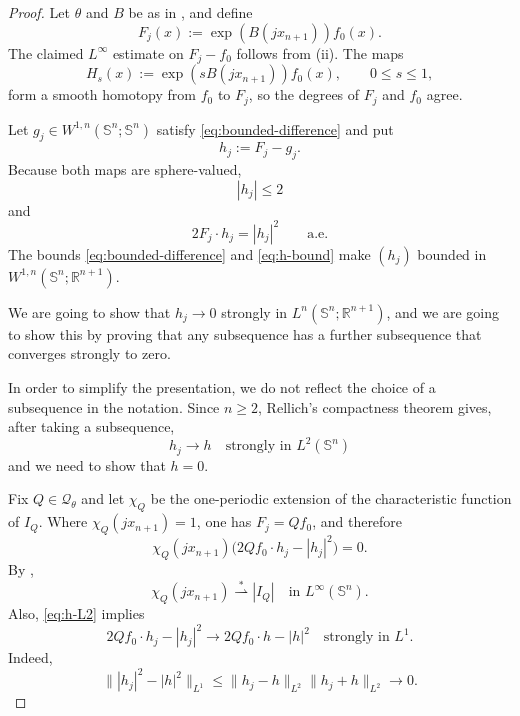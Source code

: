 \documentclass[10pt,a4paper]{amsart}
\newcommand{\R}{\mathbb R}
\newcommand{\Sph}{\mathbb S}
\newcommand{\weakstar}{\mathrel{\stackrel{*}{\rightharpoonup}}}
\begin{document}
\begin{proof}
Let $\theta$ and $B$ be as in , and define
\begin{equation}\label{eq:Fj-def}
  F_j(x):=\exp(B(jx_{n+1}))f_0(x).
\end{equation}
The claimed $L^\infty$ estimate on $F_j-f_0$ follows from (ii).  The maps
\[
  H_s(x):=\exp(sB(jx_{n+1}))f_0(x),
  \qquad0\le s\le1,
\]
form a smooth homotopy from $f_0$ to $F_j$, so the degrees of $F_j$ and $f_0$ agree.

Let $g_j\in W^{1,n}(\Sph^n;\Sph^n)$ satisfy \eqref{eq:bounded-difference} and put
\[
  h_j:=F_j-g_j.
\]
Because both maps are sphere-valued,
\begin{equation}\label{eq:h-bound}
  |h_j|\le2
\end{equation}
and
\begin{equation}\label{eq:sphere-identity}
  2F_j\cdot h_j=|h_j|^2
  \qquad\text{a.e.}
\end{equation}
The bounds \eqref{eq:bounded-difference} and \eqref{eq:h-bound} make $(h_j)$ bounded in $W^{1,n}(\Sph^n;\R^{n+1})$. 

We are going to show that $h_j\to 0$ strongly in $L^n(\Sph^n;\R^{n+1})$, and we are going to show this by proving that any subsequence has a further subsequence that converges strongly to zero. 

In order to simplify the presentation, we do not reflect the choice of a subsequence in the notation. Since $n\ge2$, Rellich's compactness theorem gives, after taking a subsequence,
\begin{equation}\label{eq:h-L2}
  h_j\to h\quad\text{strongly in }L^2(\Sph^n)
\end{equation}
and we need to show that $h=0$.

Fix $Q\in\mathcal Q_\theta$ and let $\chi_Q$ be the one-periodic extension of the characteristic function of $I_Q$.  Where $\chi_Q(jx_{n+1})=1$, one has $F_j=Qf_0$, and therefore
\begin{equation}\label{eq:plateau-identity}
  \chi_Q(jx_{n+1})
  \bigl(2Qf_0\cdot h_j-|h_j|^2\bigr)=0.
\end{equation}
By ,
\begin{equation}\label{eq:chi-average}
  \chi_Q(jx_{n+1})\weakstar |I_Q|
  \quad\text{in }L^\infty(\Sph^n).
\end{equation}
Also, \eqref{eq:h-L2} implies
\begin{equation}\label{eq:nonlinear-L1}
  2Qf_0\cdot h_j-|h_j|^2
  \to2Qf_0\cdot h-|h|^2
  \quad\text{strongly in }L^1.
\end{equation}
Indeed,
\[
  \||h_j|^2-|h|^2\|_{L^1}
  \le\|h_j-h\|_{L^2}\|h_j+h\|_{L^2}\to0.
\]


\end{proof}
\end{document}
